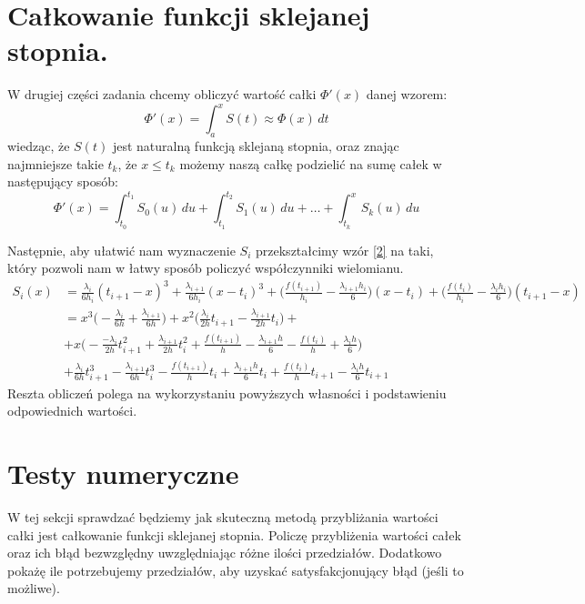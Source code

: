 \documentclass[a4paper]{article}
\newcommand{\RomanNumeralCaps}[1]
    {\MakeUppercase{\romannumeral #1}}
\begin{document}
\newpage
\section{Całkowanie funkcji sklejanej \RomanNumeralCaps{3} stopnia.}
    W drugiej części zadania chcemy obliczyć wartość całki $\Phi'(x)$ danej wzorem:
    \[
        \Phi'(x) = \int_{a}^{x} S(t) \approx \Phi(x)\, dt  
    \]
    wiedząc, że $S(t)$ jest naturalną funkcją sklejaną \RomanNumeralCaps{3} stopnia, oraz znając najmniejsze takie $t_k$, że $x \leq t_k$
    możemy naszą całkę podzielić na sumę całek w następujący sposób:
    \[
        \Phi'(x) = \int_{t_0}^{t_1} S_0(u) \, du + \int_{t_1}^{t_2} S_1(u) \, du + \dotsc + \int_{t_k}^{x} S_k(u) \, du
    \]

    Następnie, aby ułatwić nam wyznaczenie $S_i$ przekształcimy wzór \eqref{2} na taki, który pozwoli nam w łatwy sposób policzyć
    współczynniki wielomianu.
    \[
        \begin{split}
            S_i(x) & = \frac{\lambda_i}{6h_i}(t_{i+1} - x)^3 + \frac{\lambda_{i+1}}{6h_i}(x - t_i)^3 + 
                \bigg(\frac{f(t_{i+1})}{h_i} - \frac{\lambda_{i+1}h_i}{6}\bigg)(x - t_i) +
                \bigg(\frac{f(t_{i})}{h_i} - \frac{\lambda_ih_i}{6}\bigg)(t_{i+1} - x) \\
                  & = x^3\bigg(-\frac{\lambda_i}{6h} + \frac{\lambda_{i+1}}{6h}\bigg) +
                  x^2\bigg(\frac{\lambda_i}{2h}t_{i+1} - \frac{\lambda_{i+1}}{2h}t_i\bigg) + \\
                  & + x\bigg(-\frac{-\lambda_i}{2h}t_{i+1}^2 + \frac{\lambda_{i+1}}{2h}t_i^2 + \frac{f(t_{i+1})}{h} -
                  \frac{\lambda_{i+1}h}{6} - \frac{f(t_i)}{h} + \frac{\lambda_ih}{6}\bigg) \\
                  & + \frac{\lambda_i}{6h}t_{i+1}^3 - \frac{\lambda_{i+1}}{6h}t_i^3 - \frac{f(t_{i+1})}{h}t_i
                  + \frac{\lambda_{i+1}h}{6}t_i + \frac{f(t_i)}{h}t_{i+1} - \frac{\lambda_ih}{6}t_{i+1}
        \end{split}
    \]
    Reszta obliczeń polega na wykorzystaniu powyższych własności i podstawieniu odpowiednich wartości.

\section{Testy numeryczne}
    W tej sekcji sprawdzać będziemy jak skuteczną metodą przybliżania wartości całki jest całkowanie funkcji sklejanej \RomanNumeralCaps{3} stopnia.
    Policzę przybliżenia wartości całek oraz ich błąd bezwzględny uwzględniając różne ilości przedziałów. Dodatkowo pokażę ile potrzebujemy przedziałów,
    aby uzyskać satysfakcjonujący błąd (jeśli to możliwe).
\end{document}
